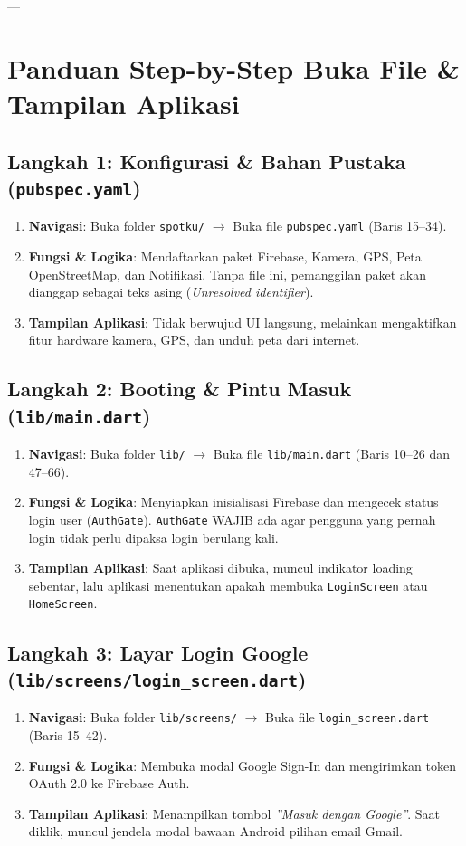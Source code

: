 \documentclass[12pt,a4paper]{article}
\begin{document}
---

\section{Panduan Step-by-Step Buka File \& Tampilan Aplikasi}

\subsection{Langkah 1: Konfigurasi \& Bahan Pustaka (\texttt{pubspec.yaml})}
\begin{enumerate}[leftmargin=*]
    \item \textbf{Navigasi}: Buka folder \texttt{spotku/} $\rightarrow$ Buka file \texttt{pubspec.yaml} (Baris 15--34).
    \item \textbf{Fungsi \& Logika}: Mendaftarkan paket Firebase, Kamera, GPS, Peta OpenStreetMap, dan Notifikasi. Tanpa file ini, pemanggilan paket akan dianggap sebagai teks asing (\textit{Unresolved identifier}).
    \item \textbf{Tampilan Aplikasi}: Tidak berwujud UI langsung, melainkan mengaktifkan fitur hardware kamera, GPS, dan unduh peta dari internet.
\end{enumerate}

\subsection{Langkah 2: Booting \& Pintu Masuk (\texttt{lib/main.dart})}
\begin{enumerate}[leftmargin=*]
    \item \textbf{Navigasi}: Buka folder \texttt{lib/} $\rightarrow$ Buka file \texttt{lib/main.dart} (Baris 10--26 dan 47--66).
    \item \textbf{Fungsi \& Logika}: Menyiapkan inisialisasi Firebase dan mengecek status login user (\texttt{AuthGate}). \texttt{AuthGate} WAJIB ada agar pengguna yang pernah login tidak perlu dipaksa login berulang kali.
    \item \textbf{Tampilan Aplikasi}: Saat aplikasi dibuka, muncul indikator loading sebentar, lalu aplikasi menentukan apakah membuka \texttt{LoginScreen} atau \texttt{HomeScreen}.
\end{enumerate}

\subsection{Langkah 3: Layar Login Google (\texttt{lib/screens/login\_screen.dart})}
\begin{enumerate}[leftmargin=*]
    \item \textbf{Navigasi}: Buka folder \texttt{lib/screens/} $\rightarrow$ Buka file \texttt{login\_screen.dart} (Baris 15--42).
    \item \textbf{Fungsi \& Logika}: Membuka modal Google Sign-In dan mengirimkan token OAuth 2.0 ke Firebase Auth.
    \item \textbf{Tampilan Aplikasi}: Menampilkan tombol \textit{''Masuk dengan Google''}. Saat diklik, muncul jendela modal bawaan Android pilihan email Gmail.
\end{enumerate}
\end{document}
